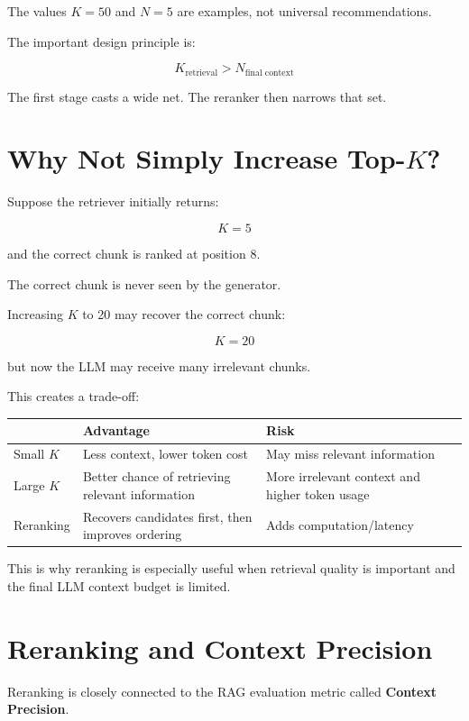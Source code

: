 \documentclass[12pt, a4paper]{article}
\begin{document}
The values $K=50$ and $N=5$ are examples, not universal recommendations.

The important design principle is:

\[
K_{\text{retrieval}} > N_{\text{final context}}
\]

The first stage casts a wide net. The reranker then narrows that set.

\section{Why Not Simply Increase Top-$K$?}

Suppose the retriever initially returns:

\[
K=5
\]

and the correct chunk is ranked at position 8.

The correct chunk is never seen by the generator.

Increasing $K$ to 20 may recover the correct chunk:

\[
K=20
\]

but now the LLM may receive many irrelevant chunks.

This creates a trade-off:

\begin{center}
\begin{tabular}{p{}p{}p{}}
\toprule
 & \textbf{Advantage} & \textbf{Risk}\\
\midrule
Small $K$ & Less context, lower token cost & May miss relevant information\\
Large $K$ & Better chance of retrieving relevant information & More irrelevant context and higher token usage\\
Reranking & Recovers candidates first, then improves ordering & Adds computation/latency\\
\bottomrule
\end{tabular}
\end{center}

This is why reranking is especially useful when retrieval quality is important and the final LLM context budget is limited.

\section{Reranking and Context Precision}

Reranking is closely connected to the RAG evaluation metric called \textbf{Context Precision}.
\end{document}
